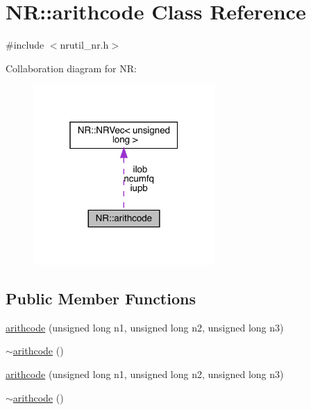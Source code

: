 \hypertarget{classNR_1_1arithcode}{}\section{NR\+:\+:arithcode Class Reference}
\label{classNR_1_1arithcode}


{\ttfamily \#include $<$nrutil\+\_\+nr.\+h$>$}



Collaboration diagram for NR\+:\nopagebreak
\begin{figure}[H]
\begin{center}
\leavevmode
\includegraphics[width=196pt]{dc/d66/classNR_1_1arithcode__coll__graph}
\end{center}
\end{figure}
\subsection*{Public Member Functions}
\begin{DoxyCompactItemize}
\item 
\mbox{\hyperlink{classNR_1_1arithcode_a796f8507b3d8ca8262843905ea6712ec}{arithcode}} (unsigned long n1, unsigned long n2, unsigned long n3)
\item 
\mbox{\hyperlink{classNR_1_1arithcode_a79953c7e7e1ac195e20884e7498cccae}{$\sim$arithcode}} ()
\item 
\mbox{\hyperlink{classNR_1_1arithcode_a796f8507b3d8ca8262843905ea6712ec}{arithcode}} (unsigned long n1, unsigned long n2, unsigned long n3)
\item 
\mbox{\hyperlink{classNR_1_1arithcode_a79953c7e7e1ac195e20884e7498cccae}{$\sim$arithcode}} ()
\end{DoxyCompactItemize}
